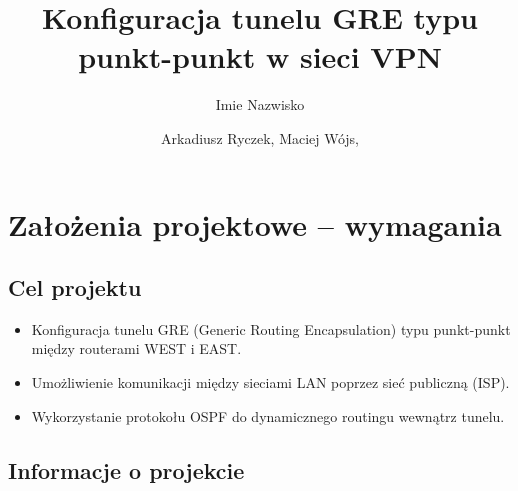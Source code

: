 \documentclass[12pt,twoside,a4paper,openany]{article}
\title{Konfiguracja tunelu GRE typu punkt-punkt w sieci VPN}		%
\author{Imie Nazwisko}
\author{Arkadiusz Ryczek, Maciej Wójs,  }
\begin{document}
\renewcommand{\figurename}{Rys.}    %
\renewcommand{\tablename}{Tab.}     %
\thispagestyle{empty}               %
\stronatytulowa                     %


\pagestyle{fancy}
\newpage

\renewcommand{\cftbeforesecskip}{8pt}
\renewcommand{\cftsecafterpnum}{\vskip 8pt}
\renewcommand{\cftparskip}{3pt}
\renewcommand{\cfttoctitlefont}{\Large\bfseries\sffamily}
\renewcommand{\cftsecfont}{\bfseries\sffamily}
\renewcommand{\cftsubsecfont}{\sffamily}
\renewcommand{\cftsubsubsecfont}{\sffamily}
\renewcommand{\cftparafont}{\sffamily}

\tableofcontents    %
\thispagestyle{fancy}
\newpage

\section{Założenia projektowe – wymagania}


\subsection{Cel projektu}
\begin{itemize}
    \item Konfiguracja tunelu GRE (Generic Routing Encapsulation) typu punkt-punkt między routerami WEST i EAST.
    \item Umożliwienie komunikacji między sieciami LAN poprzez sieć publiczną (ISP).
    \item Wykorzystanie protokołu OSPF do dynamicznego routingu wewnątrz tunelu.
\end{itemize}
\subsection{Informacje o projekcie}



\clearpage
{}
\end{document}
